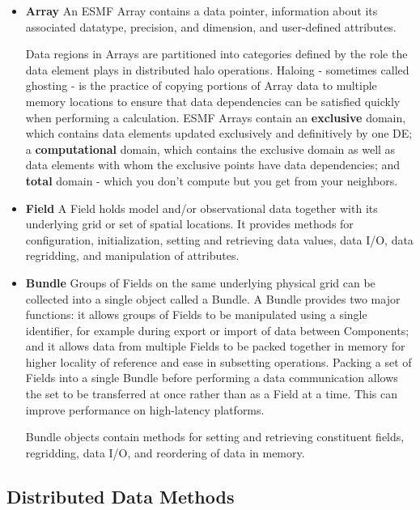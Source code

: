 \begin{itemize}

\item {\bf Array}  An ESMF Array contains a data pointer, 
information about its associated datatype, precision, and 
dimension, and user-defined attributes.  

Data regions in Arrays are partitioned into categories defined 
by the role the data element plays in distributed halo operations.  
Haloing - sometimes called ghosting - is the practice of 
copying portions of Array data to multiple memory locations 
to ensure that data dependencies can be satisfied quickly 
when performing a calculation.  ESMF Arrays contain 
an {\bf exclusive} domain, which contains data elements
updated exclusively and definitively by one DE; a
{\bf computational} domain, which contains the exclusive domain
as well as data elements with whom the exclusive points have
data dependencies; and {\bf total} domain - which you don't 
compute but you get from your neighbors.

\item {\bf Field}  A Field holds model and/or observational 
data together with its underlying grid or set of spatial locations.  
It provides methods for configuration, initialization, setting and
retrieving data values, data I/O, data regridding, and 
manipulation of attributes.

\item {\bf Bundle} Groups of Fields on the same underlying 
physical grid can be collected into a single object called a Bundle.  
A Bundle provides two major functions: it allows groups of 
Fields to be manipulated using a single identifier, for example 
during export or import of data between Components; and 
it allows data from multiple Fields to be packed together 
in memory for higher locality of reference and ease in 
subsetting operations.  Packing a set of Fields into a single
Bundle before performing a data communication allows the set 
to be transferred at once rather than as a Field at a time.
This can improve performance on high-latency platforms.

Bundle objects contain methods for setting and retrieving constituent 
fields, regridding, data I/O, and reordering of data in memory.

\end{itemize}

\subsection{Distributed Data Methods}

